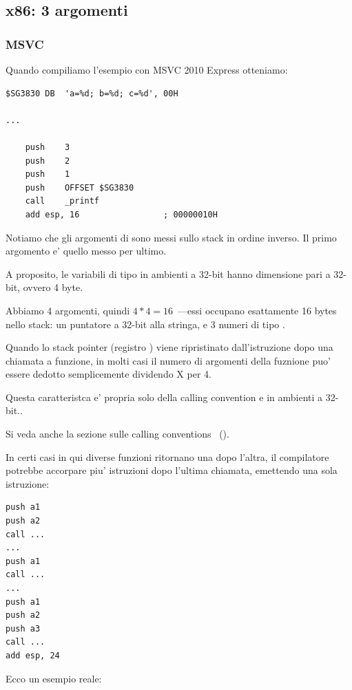 \subsection{x86: 3 argomenti}

\subsubsection{MSVC}

Quando compiliamo l'esempio con MSVC 2010 Express otteniamo:

\begin{lstlisting}
$SG3830	DB	'a=%d; b=%d; c=%d', 00H

...

	push	3
	push	2
	push	1
	push	OFFSET $SG3830
	call	_printf
	add	esp, 16					; 00000010H
\end{lstlisting}

Notiamo che gli argomenti di \printf sono messi sullo stack in ordine inverso. Il primo argomento e' quello messo per ultimo.

A proposito, le variabili di tipo \Tint in ambienti a 32-bit hanno dimensione pari a 32-bit, ovvero 4 byte.

Abbiamo 4 argomenti, quindi $4*4 = 16$~---essi occupano esattamente 16 bytes nello stack: un puntatore a 32-bit alla stringa,  e 3 numeri di tipo \Tint.

Quando lo \gls{stack pointer} (registro \ESP) viene ripristinato dall'istruzione 
dopo una chiamata a funzione, in molti casi il numero di argomenti della fuznione puo' essere dedotto semplicemente dividendo X per 4.

Questa caratteristca  e' propria solo della calling convention  e in ambienti a 32-bit..

Si veda anche la sezione sulle calling conventions ~().

In certi casi in qui diverse funzioni ritornano una dopo l'altra, il compilatore potrebbe accorpare piu' istruzioni  
dopo l'ultima chiamata, emettendo una sola istruzione:

\begin{lstlisting}
push a1
push a2
call ...
...
push a1
call ...
...
push a1
push a2
push a3
call ...
add esp, 24
\end{lstlisting}

Ecco un esempio reale:



